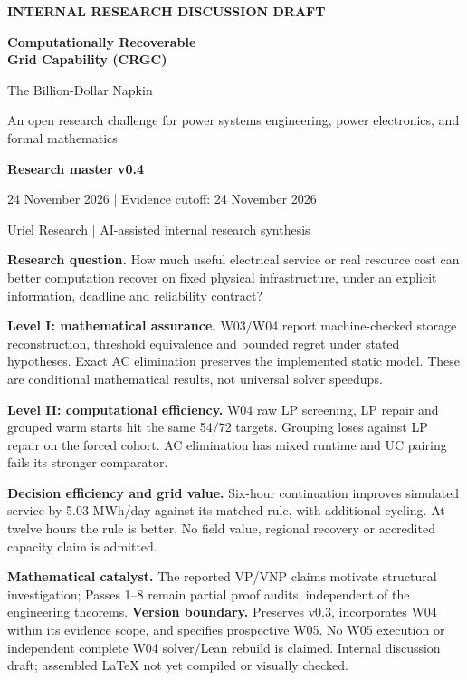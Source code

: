 \documentclass[11pt,letterpaper]{article}
\begin{document}
\hypersetup{pageanchor=false}\begin{titlepage}
{\small\bfseries INTERNAL RESEARCH DISCUSSION DRAFT\par}\vspace{1.2cm}
{\Huge\color{navy}\bfseries Computationally Recoverable\\[4pt] Grid Capability (CRGC)\par}\vspace{0.6cm}
{\LARGE The Billion-Dollar Napkin\par}\vspace{0.35cm}
{\large An open research challenge for power systems engineering, power electronics, and formal mathematics\par}\vspace{0.8cm}
{\Large\bfseries Research master v0.4\par}
24 November 2026 \quad | \quad Evidence cutoff: 24 November 2026\par
Uriel Research \quad | \quad AI-assisted internal research synthesis\par
\vspace{0.9cm}
\textbf{Research question.} How much useful electrical service or real resource cost can better computation recover on fixed physical infrastructure, under an explicit information, deadline and reliability contract?

\textbf{Level I: mathematical assurance.} W03/W04 report machine-checked storage reconstruction, threshold equivalence and bounded regret under stated hypotheses. Exact AC elimination preserves the implemented static model. These are conditional mathematical results, not universal solver speedups.

\textbf{Level II: computational efficiency.} W04 raw LP screening, LP repair and grouped warm starts hit the same 54/72 targets. Grouping loses against LP repair on the forced cohort. AC elimination has mixed runtime and UC pairing fails its stronger comparator.

\textbf{Decision efficiency and grid value.} Six-hour continuation improves simulated service by 5.03 MWh/day against its matched rule, with additional cycling. At twelve hours the rule is better. No field value, regional recovery or accredited capacity claim is admitted.

\textbf{Mathematical catalyst.} The reported VP/VNP claims motivate structural investigation; Passes 1--8 remain partial proof audits, independent of the engineering theorems.
\vfill
\textbf{Version boundary.} Preserves v0.3, incorporates W04 within its evidence scope, and specifies prospective W05. No W05 execution or independent complete W04 solver/Lean rebuild is claimed. Internal discussion draft; assembled LaTeX not yet compiled or visually checked.
\end{titlepage}\hypersetup{pageanchor=true}
\end{document}
